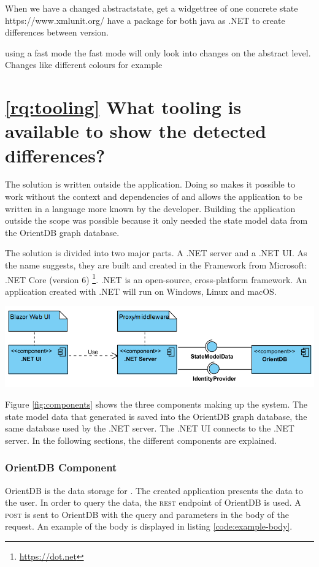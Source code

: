 When we have a changed abstractstate, get a widgettree of one concrete state
https://www.xmlunit.org/  have a package for both java as .NET to create differences between version.

using a fast mode
the fast mode will only look into changes on the abstract level. Changes like different colours for example




\section{\ref{rq:tooling} What tooling is available to show the detected differences?}

The solution is written outside the \testar application. Doing so makes it possible to work without the context and dependencies of \testar and allows the application to be written in a language more known by the developer. Building the application outside the \testar scope was possible because it only needed the state model data from the OrientDB graph database.

The solution is divided into two major parts. A \testar .NET server and a \testar .NET UI. As the name suggests, they are built and created in the Framework from Microsoft: .NET Core (version 6) \footnote{\url{https://dot.net}}. .NET is an open-source, cross-platform framework. An application created with .NET will run on Windows, Linux and macOS. 

\begingroup
\captionsetup{type=figure}
\includegraphics[scale=0.7]{thesis/images/server-ui-comp.png}
\label{fig:components}
\endgroup

Figure \ref{fig:components} shows the three components making up the system. The state model data that \testar generated is saved into the OrientDB graph database, the same database used by the .NET server. The .NET UI connects to the .NET server. In the following sections, the different components are explained. 

\subsubsection{OrientDB Component}
OrientDB is the data storage for \testar. The created application presents the data to the user. In order to query the data, the \textsc{rest} endpoint of OrientDB is used. A \textsc{post} is sent to OrientDB with the query and parameters in the body of the request. An example of the body is displayed in listing \ref{code:example-body}.

